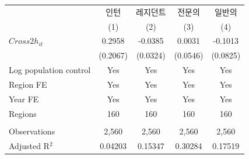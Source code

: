 \begingroup
\centering
\begin{tabular}{lcccc}
   \toprule
                          & 인턴     & 레지던트 & 전문의   & 일반의 \\   
                          & (1)      & (2)      & (3)      & (4)\\  
   \midrule 
   $Cross2h_{it}$         & 0.2958   & -0.0385  & 0.0031   & -0.1013\\   
                          & (0.2067) & (0.0324) & (0.0546) & (0.0825)\\   
   Log population control & Yes      & Yes      & Yes      & Yes\\  
   Region FE              & Yes      & Yes      & Yes      & Yes\\  
   Year FE                & Yes      & Yes      & Yes      & Yes\\  
   Regions                & 160      & 160      & 160      & 160\\  
    \\
   Observations           & 2,560    & 2,560    & 2,560    & 2,560\\  
   Adjusted R$^2$         & 0.04203  & 0.15347  & 0.30284  & 0.17519\\  
   \bottomrule
\end{tabular}
\par\endgroup
